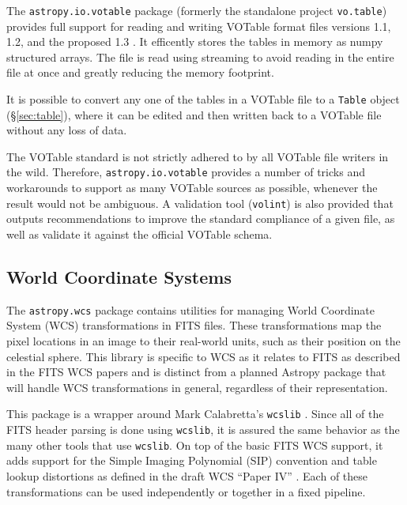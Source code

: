\documentclass[traditabstract]{aa}
\begin{document}
\label{sec:votable}


The \texttt{astropy.io.votable} package (formerly the standalone project
\texttt{vo.table}) provides full support for reading and writing VOTable format
files versions 1.1, 1.2, and the proposed 1.3
\citep{ochsenbein2004votable,ochsenbein2009votable}. It efficently stores the
tables in memory as \gls{numpy} structured arrays. The file is read using streaming
to avoid reading in the entire file at once and greatly reducing the memory
footprint.

It is possible to convert any one of the tables in a VOTable file to a
\texttt{Table} object (\S\ref{sec:table}), where it can be edited and then
written back to a VOTable file without any loss of data.

The VOTable standard is not strictly adhered to by all VOTable file writers in
the wild. Therefore, \texttt{astropy.io.votable} provides a number of tricks
and workarounds to support as many VOTable sources as possible, whenever the
result would not be ambiguous. A validation tool (\texttt{volint}) is also
provided that outputs recommendations to improve the standard compliance of a
given file, as well as validate it against the official VOTable schema.

\subsection{World Coordinate Systems}

\label{sec:wcs}


The \texttt{astropy.wcs} package contains utilities for managing World
Coordinate System (WCS) transformations in FITS files. These transformations
map the pixel locations in an image to their real-world units, such as their
position on the celestial sphere. This library is specific to WCS as it relates
to FITS as described in the FITS WCS papers
\citep{greisen2002wcs,calabretta2002wcs,greisen2006wcs} and is distinct from a
planned Astropy package that will handle WCS transformations in general,
regardless of their representation.

This package is a wrapper around Mark Calabretta's \texttt{wcslib}
\citep{calabretta2013wcslib}. Since all of the FITS header parsing is done
using \texttt{wcslib}, it is assured the same behavior as the many other tools
that use \texttt{wcslib}. On top of the basic FITS WCS support, it adds support
for the Simple Imaging Polynomial (SIP) convention and table lookup distortions
as defined in the draft WCS ``Paper IV'' \citep{calabretta2004wcs}. Each of
these transformations can be used independently or together in a fixed
pipeline.
\end{document}
